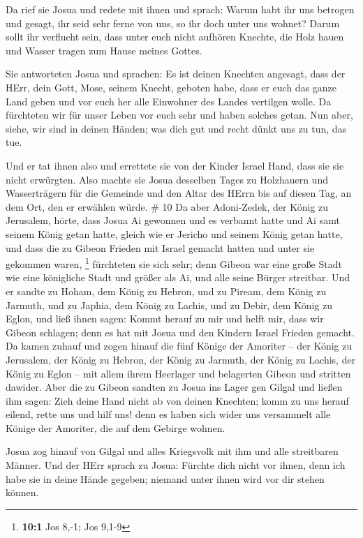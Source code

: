  Da rief sie Josua und redete mit ihnen und sprach: Warum
habt ihr uns betrogen und gesagt, ihr seid sehr ferne von uns, so ihr
doch unter uns wohnet?  Darum sollt ihr verflucht sein,
dass unter euch nicht aufhören Knechte, die Holz hauen und Wasser tragen
zum Hause meines Gottes.

 Sie antworteten Josua und sprachen: Es ist deinen Knechten
angesagt, dass der HErr, dein Gott, Mose, seinem Knecht, geboten habe,
dass er euch das ganze Land geben und vor euch her alle Einwohner des
Landes vertilgen wolle. Da fürchteten wir für unser Leben vor euch sehr
und haben solches getan.  Nun aber, siehe, wir sind in
deinen Händen; was dich gut und recht dünkt uns zu tun, das tue.

 Und er tat ihnen also und errettete sie von der Kinder
Israel Hand, dass sie sie nicht erwürgten.  Also machte sie
Josua desselben Tages zu Holzhauern und Wasserträgern für die Gemeinde
und den Altar des HErrn bis auf diesen Tag, an dem Ort, den er erwählen
würde. \# 10  Da aber Adoni-Zedek, der König zu Jerusalem,
hörte, dass Josua Ai gewonnen und es verbannt hatte und Ai samt seinem
König getan hatte, gleich wie er Jericho und seinem König getan hatte,
und dass die zu Gibeon Frieden mit Israel gemacht hatten und unter sie
gekommen waren, \footnote{\textbf{10:1} Jos 8,-1; Jos 9,1-9}
 fürchteten sie sich sehr; denn Gibeon war eine große Stadt
wie eine königliche Stadt und größer als Ai, und alle seine Bürger
streitbar.  Und er sandte zu Hoham, dem König zu Hebron, und
zu Piream, dem König zu Jarmuth, und zu Japhia, dem König zu Lachis, und
zu Debir, dem König zu Eglon, und ließ ihnen sagen:  Kommt
herauf zu mir und helft mir, dass wir Gibeon schlagen; denn es hat mit
Josua und den Kindern Israel Frieden gemacht.  Da kamen
zuhauf und zogen hinauf die fünf Könige der Amoriter -- der König zu
Jerusalem, der König zu Hebron, der König zu Jarmuth, der König zu
Lachis, der König zu Eglon -- mit allem ihrem Heerlager und belagerten
Gibeon und stritten dawider.  Aber die zu Gibeon sandten zu
Josua ins Lager gen Gilgal und ließen ihm sagen: Zieh deine Hand nicht
ab von deinen Knechten; komm zu uns herauf eilend, rette uns und hilf
uns! denn es haben sich wider uns versammelt alle Könige der Amoriter,
die auf dem Gebirge wohnen.

 Josua zog hinauf von Gilgal und alles Kriegsvolk mit ihm
und alle streitbaren Männer.  Und der HErr sprach zu Josua:
Fürchte dich nicht vor ihnen, denn ich habe sie in deine Hände gegeben;
niemand unter ihnen wird vor dir stehen können.

